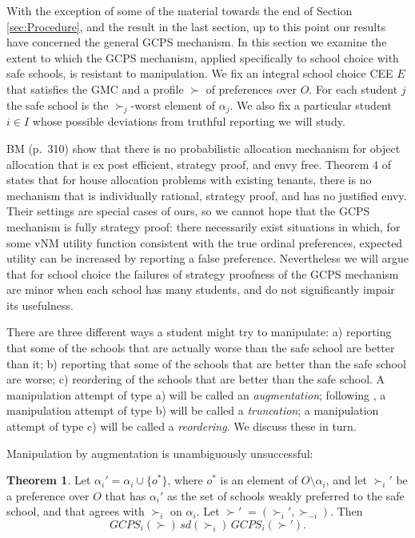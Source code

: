 \documentclass[12pt, A4paper]{article}
\theoremstyle{definition}
\newtheorem{thm}{Theorem}
\begin{document}
With the exception of some of the material towards the end of Section \ref{sec:Procedure}, and the result in the last section, up to this point our results have concerned the general GCPS mechanism.  In this section we examine the extent to which the GCPS mechanism, applied specifically to school choice with safe schools, is resistant to manipulation.  We fix an integral school choice CEE $E$ that satisfies the GMC and a profile $\succ$ of preferences over $O$.  For each student $j$ the safe school is the $\succ_j$-worst element of $\alpha_j$.  We also fix a particular student $i \in I$ whose possible deviations from truthful reporting we will study.

BM (p.~310) show that there is no probabilistic allocation mechanism for object allocation that is ex post efficient, strategy proof, and envy free.  Theorem 4 of \citet{yilmaz10geb} states that for house allocation problems with existing tenants, there is no mechanism that is individually rational, strategy proof, and has no justified envy.
Their settings are special cases of ours, so we cannot hope that the GCPS mechanism is fully strategy proof: there necessarily exist situations in which, for some vNM utility function consistent with the true ordinal preferences, expected utility can be increased by reporting a false preference. Nevertheless we will argue that for school choice the failures of strategy proofness of the GCPS mechanism are minor when each school has many students, and do not significantly impair its usefulness.

There are three different ways a student might try to manipulate: a) reporting that some of the schools that are actually worse than the safe school are better than it;  b) reporting that some of the schools that are better than the safe school are worse; c) reordering of the schools that are better than the safe school.
A manipulation attempt of type a) will be called an \emph{augmentation}; following \cite{RoRo99ecma}, a manipulation attempt of type b) will be called a \emph{truncation}; a  manipulation attempt of type c) will be called a \emph{reordering}.  We discuss these in turn. 

Manipulation by augmentation is unambiguously unsuccessful:

\begin{thm} \label{th:Augmentation}
  Let $\alpha_i' = \alpha_i \cup \{o^*\}$, where $o^*$ is an element of $O \setminus \alpha_i$, and let $\succ_i'$ be a preference over $O$ that has $\alpha_i'$ as the set of schools weakly preferred to the safe school, and that  agrees with $\succ_i$ on $\alpha_i$.  Let $\succ' \; = (\succ_i',\succ_{-i})$.  Then 
$$GCPS_i(\succ) \, sd(\succ_i) \, GCPS_i(\succ').$$
\end{thm}
\end{document}

